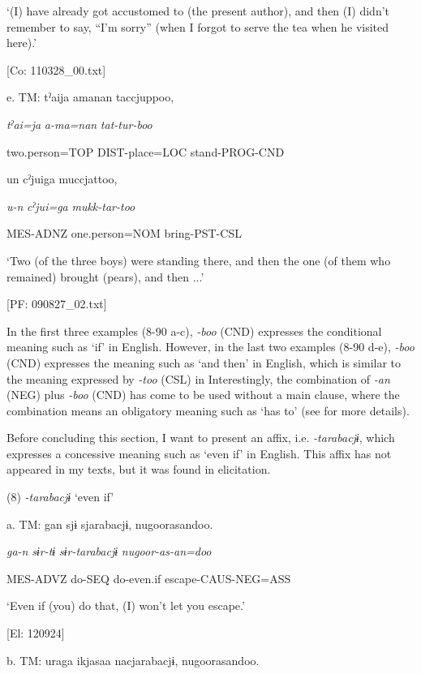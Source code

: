       ‘(I) have already got accustomed to (the present author), and then (I) didn’t remember to say, “I’m sorry” (when I forgot to serve the tea when he visited here).’

      [Co: 110328\_00.txt]

  e.  TM:  tˀaija  amanan  taccjuppoo,

      \textit{tˀai=ja}  \textit{a-ma=nan}  \textit{tat-tur-boo}

      two.person=TOP  DIST-place=LOC  stand-PROG-CND

      un  cˀjuiga  muccjattoo,

      \textit{u-n}  \textit{cˀjui=ga}  \textit{mukk-tar-too}

      MES-ADNZ  one.person=NOM  bring-PST-CSL

      ‘Two (of the three boys) were standing there, and then the one (of them who remained) brought (pears), and then ...’

      [PF: 090827\_02.txt]

In the first three examples (8-90 a-c), \textit{{}-boo} (CND) expresses the conditional meaning such as ‘if’ in English. However, in the last two examples (8-90 d-e), \textit{{}-boo} (CND) expresses the meaning such as ‘and then’ in English, which is similar to the meaning expressed by \textit{{}-too} (CSL) in  Interestingly, the combination of \textit{{}-an} (NEG) plus \textit{{}-boo} (CND) has come to be used without a main clause, where the combination means an obligatory meaning such as ‘has to’ (see  for more details).

  Before concluding this section, I want to present an affix, i.e. \textit{{}-tarabacjɨ}, which expresses a concessive meaning such as ‘even if’ in English. This affix has not appeared in my texts, but it was found in elicitation.

(8)  \textit{{}-tarabacjɨ} ‘even if’

  a.  TM:  gan  sjɨ  sjarabacjɨ,  nugoorasandoo.

      \textit{ga-n}  \textit{sɨr-tɨ}  \textit{sɨr-tarabacjɨ}  \textit{nugoor-as-an=doo}

      MES-ADVZ  do-SEQ  do-even.if  escape-CAUS-NEG=ASS

      ‘Even if (you) do that, (I) won’t let you escape.’

      [El: 120924]

  b.  TM:  uraga  ikjasaa  nacjarabacjɨ,  nugoorasandoo.

